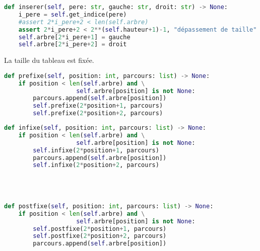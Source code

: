 \documentclass[svgnames,11pt]{beamer}
\begin{document}
\begin{frame}[fragile]

\begin{center}
\begin{lstlisting}[language=Python , basicstyle=\ttfamily\small, xleftmargin=.5em, xrightmargin=-5.5em]
def inserer(self, pere: str, gauche: str, droit: str) -> None:
    i_pere = self.get_indice(pere)
    #assert 2*i_pere+2 < len(self.arbre)
    assert 2*i_pere+2 < 2**(self.hauteur+1)-1, "dépassement de taille"
    self.arbre[2*i_pere+1] = gauche
    self.arbre[2*i_pere+2] = droit
\end{lstlisting}
\end{center}    
    \begin{aretenir}[Remarque]
La taille du tableau est fixée.
    \end{aretenir}
    \end{frame}
\begin{frame}[fragile]

\begin{center}
\begin{lstlisting}[language=Python , basicstyle=\ttfamily\small, xleftmargin=.5em, xrightmargin=-3em]
def prefixe(self, position: int, parcours: list) -> None:
    if position < len(self.arbre) and \
                    self.arbre[position] is not None:
        parcours.append(self.arbre[position])
        self.prefixe(2*position+1, parcours)
        self.prefixe(2*position+2, parcours)
\end{lstlisting}
\end{center} 
    \end{frame}
    \begin{frame}[fragile]

\begin{center}
\begin{lstlisting}[language=Python , basicstyle=\ttfamily\small, xleftmargin=.5em, xrightmargin=-3.5em]
def infixe(self, position: int, parcours: list) -> None:
    if position < len(self.arbre) and \
                    self.arbre[position] is not None:
        self.infixe(2*position+1, parcours)
        parcours.append(self.arbre[position])
        self.infixe(2*position+2, parcours)




def postfixe(self, position: int, parcours: list) -> None:
    if position < len(self.arbre) and \
                    self.arbre[position] is not None:
        self.postfixe(2*position+1, parcours)
        self.postfixe(2*position+2, parcours)
        parcours.append(self.arbre[position])
\end{lstlisting}
\end{center} 
    \end{frame}
\end{document}

